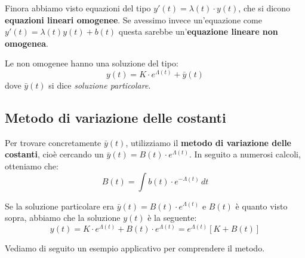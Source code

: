 \documentclass[12pt]{report}
\begin{document}
	Finora abbiamo visto equazioni del tipo $y'(t) = \lambda(t) \cdot y(t)$, che si dicono \textbf{equazioni lineari omogenee}.
	Se avessimo invece un'equazione come $y'(t) = \lambda(t)y(t) + b(t)$ questa sarebbe un'\textbf{equazione lineare non omogenea}.
	
	Le non omogenee hanno una soluzione del tipo:
	\[
	y(t) = K \cdot e^{\Lambda(t)} + \bar{y}(t)
	\]
	dove $\bar{y}(t)$ si dice \textit{soluzione particolare}.
	
	\subsection{Metodo di variazione delle costanti}
	
	Per trovare concretamente $\bar{y}(t)$, utilizziamo il \textbf{metodo di variazione delle costanti}, cioè cercando un $\bar{y}(t) = B(t) \cdot e^{\Lambda(t)}$.
	In seguito a numerosi calcoli, otteniamo che:
	\[
	B(t) = \int b(t) \cdot e^{-\Lambda(t)} \, dt
	\]
	
	Se la soluzione particolare era $\bar{y}(t) = B(t) \cdot e^{\Lambda(t)}$ e $B(t)$ è quanto visto sopra, abbiamo che la soluzione $y(t)$ è la seguente:
	\[
	y(t) = K \cdot e^{\Lambda(t)} + B(t) \cdot e^{\Lambda(t)} = e^{\Lambda(t)}[K + B(t)]
	\]
	
	Vediamo di seguito un esempio applicativo per comprendere il metodo.
	
\end{document}
